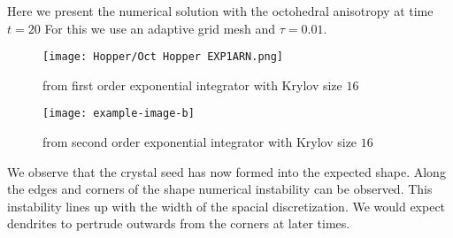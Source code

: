 Here we present the numerical solution with the octohedral anisotropy at time $t=20$
For this we use an adaptive grid mesh and $\tau = 0.01$.
\begin{figure}[H]
    \centering
    \begin{minipage}{0.49\textwidth}
        \texttt{[image: Hopper/Oct Hopper EXP1ARN.png]} %
        \caption{from first order exponential integrator with Krylov size $16$}
        \label{fig:first order 8 0.5}
    \end{minipage}\hfill
    \centering
    \begin{minipage}{0.49\textwidth}
        \texttt{[image: example-image-b]} %
        \caption{from second order exponential integrator with Krylov size $16$}
        \label{fig:first order 10 0.5}
    \end{minipage}\hfill
\end{figure}
We observe that the crystal seed has now formed into the expected shape.
Along the edges and corners of the shape numerical instability can be observed.
This instability lines up with the width of the spacial discretization.
We would expect dendrites to pertrude outwards from the corners at later times.

